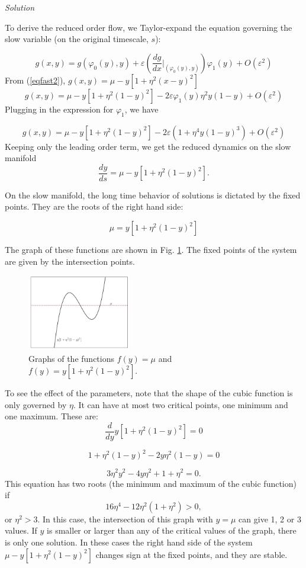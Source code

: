 \documentclass[a4paper,11pt,pdftex]{article}
\begin{document}
\emph{Solution}

To derive the reduced order flow, we Taylor-expand the equation governing the slow variable (on the original timescale, $s$):

\begin{equation*}
    g(x,y) = g(\varphi_0(y), y) + \varepsilon\left(\frac{d g}{dx}|_{(\varphi_0(y),y)}\right)\varphi_1(y) + O(\varepsilon^2)
\end{equation*}
From (\ref{eqfast2}), $g(x,y)= \mu - y[1+\eta^2(x-y)^2]$
$$
g(x,y) = \mu - y[1+\eta^2(1-y)^2] -2 \varepsilon\varphi_1(y)\eta^2y(1-y) + O(\varepsilon^2)
$$
Plugging in the expression for $\varphi_1$, we have

$$
g(x,y) = \mu - y[1+\eta^2(1-y)^2] -2 \varepsilon(1 + \eta^4y(1-y)^3) + O(\varepsilon^2)
$$
Keeping only the leading order term, we get the reduced dynamics on the slow manifold
$$
\frac{dy}{ds} = \mu - y[1+\eta^2(1-y)^2].
$$

On the slow manifold, the long time behavior of solutions is dictated by the fixed points. They are the roots of the right hand side:

$$
\mu = y[1+\eta^2(1-y)^2]
$$

The graph of these functions are shown in Fig. \ref{fig:c}. The fixed points of the system are given by the intersection points. 
\begin{figure}[h!]
    \centering
    \includegraphics[width = 0.4\textwidth]{cubic.png}
    \caption{Graphs of the functions $f(y) = \mu$ and $f(y)= y[1+\eta^2(1-y)^2]$.}
    \label{fig:c}
\end{figure}
To see the effect of the parameters, note that the shape of the cubic function is only governed by $\eta$. It can have at most two critical points, one minimum and one maximum. These are:
$$
\frac{d}{dy}y[1+\eta^2(1-y)^2] =0
$$

$$
1 + \eta^2(1-y)^2 - 2y \eta^2 (1-y) = 0
$$

$$
3\eta^2 y^2 - 4y\eta^2 +1 + \eta^2 = 0.
$$
This equation has two roots (the minimum and maximum of the cubic function) if 
$$
16\eta^4 - 12\eta^2(1+\eta^2) > 0,
$$
or $\eta^2 > 3$. In this case, the intersection of this graph with $y=\mu$ can give 1, 2 or 3 values. If $y$ is smaller or larger than any of the critical values of the graph, there is only one solution. In these cases the right hand side of the system $\mu - y[1+\eta^2(1-y)^2]$ changes sign at the fixed points, and they are stable. 
\end{document}

